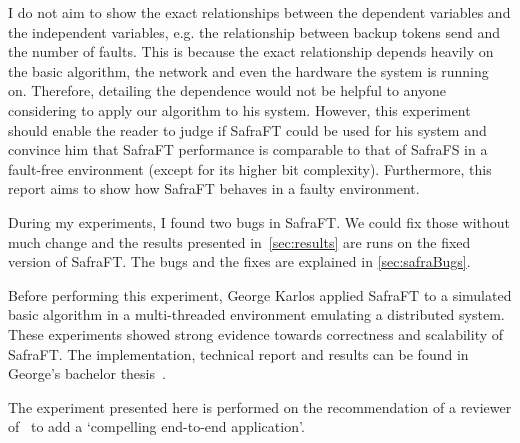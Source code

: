 I do not aim to show the exact relationships between the dependent variables and the independent variables, e.g. the relationship between backup tokens send and the number of faults.
This is because the exact relationship depends heavily on the basic algorithm, the network and even the hardware the system is running on.
Therefore, detailing the dependence would not be helpful to anyone considering to apply our algorithm to his system.
However, this experiment should enable the reader to judge if SafraFT could be used for his system and convince him that SafraFT performance is comparable to that of SafraFS in a fault-free environment (except for its higher bit complexity).
Furthermore, this report aims to show how SafraFT behaves in a faulty environment.

During my experiments, I found two bugs in SafraFT.
We could fix those without much change and the results presented in~\cref{sec:results} are runs on the fixed version of SafraFT.
The bugs and the fixes are explained in \cref{sec:safraBugs}.

Before performing this experiment, George Karlos applied SafraFT to a simulated basic algorithm in a multi-threaded environment emulating a distributed system.
These experiments showed strong evidence towards correctness and scalability of SafraFT.
The implementation, technical report and results can be found in George's bachelor thesis~\cite{karlos}.

The experiment presented here is performed on the recommendation of a reviewer of~\cite{safraFT2018} to add a `compelling end-to-end application'.
